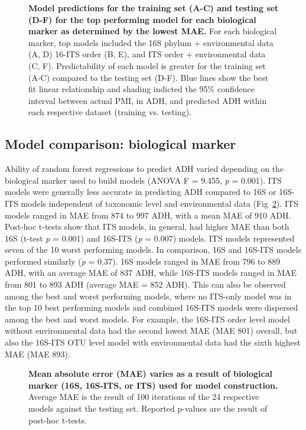 \documentclass[
  10pt,
  letterpaper,
]{article}
\begin{document}
\begin{figure}[!h]
\caption{{\bf Model predictions for the training set (A-C) and testing set (D-F) for the top performing model for each biological marker as determined by the lowest MAE.}
For each biological marker, top models included the 16S phylum + environmental data (A, D) 16-ITS order (B, E), and ITS order + environmental data (C, F). Predictability of each model is greater for the training set (A-C) compared to the testing set (D-F). Blue lines show the best fit linear relationship and shading indicted the 95\% confidence interval between actual PMI, in ADH, and predicted ADH within each respective dataset (training vs. testing).}
\label{fig2}
\end{figure}

\hypertarget{model-comparison-biological-marker}{%
\subsection{Model comparison: biological
marker}\label{model-comparison-biological-marker}}

Ability of random forest regressions to predict ADH varied depending on
the biological marker used to build models (ANOVA F = 9.455, \emph{p} =
0.001). ITS models were generally less accurate in predicting ADH
compared to 16S or 16S-ITS models independent of taxonomic level and
environmental data (Fig~\ref{fig3}). ITS models ranged in MAE from 874
to 997 ADH, with a mean MAE of 910 ADH. Post-hoc t-tests show that ITS
models, in general, had higher MAE than both 16S (t-test \emph{p} =
0.001) and 16S-ITS (\emph{p} = 0.007) models. ITS models represented
seven of the 10 worst performing models. In comparison, 16S and 16S-ITS
models performed similarly (\emph{p} = 0.37). 16S models ranged in MAE
from 796 to 889 ADH, with an average MAE of 837 ADH, while 16S-ITS
models ranged in MAE from 801 to 893 ADH (average MAE = 852 ADH). This
can also be observed among the best and worst performing models, where
no ITS-only model was in the top 10 best performing models and combined
16S-ITS models were dispersed among the best and worst models. For
example, the 16S-ITS order level model without environmental data had
the second lowest MAE (MAE 801) overall, but also the 16S-ITS OTU level
model with environmental data had the sixth highest MAE (MAE 893).

\begin{figure}[!h]
\caption{{\bf Mean absolute error (MAE) varies as a result of biological marker (16S, 16S-ITS, or ITS) used for model construction.}
Average MAE is the result of 100 iterations of the 24 respective models against the testing set. Reported p-values are the result of post-hoc t-tests.}
\label{fig3}
\end{figure}
\end{document}
